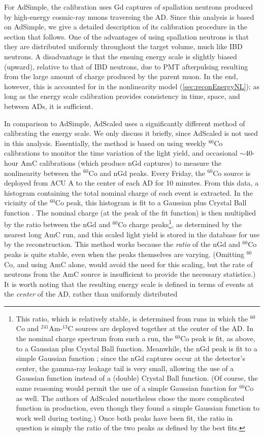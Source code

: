 \documentclass[../thesis.tex]{subfiles}
\begin{document}
For AdSimple, the calibration uses Gd captures of spallation neutrons produced by high-energy cosmic-ray muons traversing the AD. Since this analysis is based on AdSimple, we give a detailed description of its calibration procedure in the section that follows. One of the advantages of using spallation neutrons is that they are distributed uniformly throughout the target volume, much like IBD neutrons. A disadvantage is that the ensuing energy scale is slightly biased (upward), relative to that of IBD neutrons, due to PMT afterpulsing resulting from the large amount of charge produced by the parent muon. In the end, however, this is accounted for in the nonlinearity model (\autoref{sec:reconEnergyNL}); as long as the energy scale calibration provides consistency in time, space, and between ADs, it is sufficient.

In comparison to AdSimple, AdScaled uses a significantly different method of calibrating the energy scale. We only discuss it briefly, since AdScaled is not used in this analysis. Essentially, the method is based on using weekly $^{60}$Co calibrations to monitor the time variation of the light yield, and occasional $\sim$40-hour AmC calibrations (which produce nGd captures) to measure the nonlinearity between the $^{60}$Co and nGd peaks. Every Friday, the $^{60}$Co source is deployed from ACU A to the center of each AD for 10 minutes. From this data, a histogram containing the total nominal charge of each event is extracted. In the vicinity of the $^{60}$Co peak, this histogram is fit to a Gaussian plus Crystal Ball function \cite{adScaledTechnote}. The nominal charge (at the peak of the fit function) is then multiplied by the ratio between the nGd and $^{60}$Co charge peaks\footnote{This ratio, which is relatively stable, is determined from runs in which the $^{60}$Co and $^{241}$Am-$^{13}$C sources are deployed together at the center of the AD. In the nominal charge spectrum from such a run, the $^{60}$Co peak is fit, as above, to a Gaussian plus Crystal Ball function. Meanwhile, the nGd peak is fit to a simple Gaussian function \cite{adScaledTechnote}; since the nGd captures occur at the detector's center, the gamma-ray leakage tail is very small, allowing the use of a Gaussian function instead of a (double) Crystal Ball function. (Of course, the same reasoning would permit the use of a simple Gaussian function for $^{60}$Co as well. The authors of AdScaled nonetheless chose the more complicated function in production, even though they found a simple Gaussian function to work well during testing.) Once both peaks have been fit, the ratio in question is simply the ratio of the two peaks as defined by the best fits.}, as determined by the nearest long AmC run, and this scaled light yield is stored in the database for use by the reconstruction. This method works because the \emph{ratio} of the nGd and $^{60}$Co peaks is quite stable, even when the peaks themselves are varying. (Omitting $^{60}$Co, and using AmC alone, would avoid the need for this scaling, but the rate of neutrons from the AmC source is insufficient to provide the necessary statistics.) It is worth noting that the resulting energy scale is defined in terms of events at the \emph{center} of the AD, rather than uniformly distributed 
\end{document}
